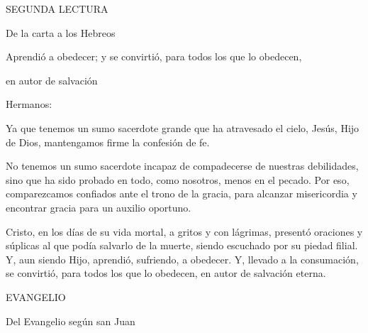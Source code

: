 			\begin{readtitle}SEGUNDA LECTURA\end{readtitle}
			
			\begin{readbook}De la carta a los Hebreos \end{readbook}
			
			\begin{readtheme}Aprendió a obedecer; y se convirtió, para todos los que lo obedecen, \end{readtheme}
			
			\begin{readtheme}en autor de salvación\end{readtheme}
			
			\begin{readbody}Hermanos: \end{readbody}
			
			\begin{readbody}Ya que tenemos un sumo sacerdote grande que ha atravesado el cielo, Jesús, Hijo de Dios, mantengamos firme la confesión de fe. \end{readbody}
			
			\begin{readbody}No tenemos un sumo sacerdote incapaz de compadecerse de nuestras debilidades, sino que ha sido probado en todo, como nosotros, menos en el pecado. Por eso, comparezcamos confiados ante el trono de la gracia, para alcanzar misericordia y encontrar gracia para un auxilio oportuno. \end{readbody}
			
			\begin{readbody}Cristo, en los días de su vida mortal, a gritos y con lágrimas, presentó oraciones y súplicas al que podía salvarlo de la muerte, siendo escuchado por su piedad filial. Y, aun siendo Hijo, aprendió, sufriendo, a obedecer. Y, llevado a la consumación, se convirtió, para todos los que lo obedecen, en autor de salvación eterna.\end{readbody}
			
			\begin{readtitle}EVANGELIO\end{readtitle}
			
			
			
			\begin{readbook}Del Evangelio según san Juan \end{readbook}
			
